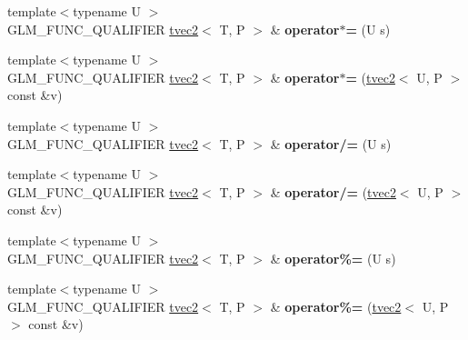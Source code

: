 \begin{DoxyCompactItemize}
\item 
\hypertarget{structglm_1_1detail_1_1tvec2_ae5c779a289045f3a99c6ee7efa608248}{{\footnotesize template$<$typename U $>$ }\\G\-L\-M\-\_\-\-F\-U\-N\-C\-\_\-\-Q\-U\-A\-L\-I\-F\-I\-E\-R \hyperlink{structglm_1_1detail_1_1tvec2}{tvec2}$<$ T, P $>$ \& {\bfseries operator$\ast$=} (U s)}\label{structglm_1_1detail_1_1tvec2_ae5c779a289045f3a99c6ee7efa608248}

\item 
\hypertarget{structglm_1_1detail_1_1tvec2_a74848e484fd662c04e7193575af09d97}{{\footnotesize template$<$typename U $>$ }\\G\-L\-M\-\_\-\-F\-U\-N\-C\-\_\-\-Q\-U\-A\-L\-I\-F\-I\-E\-R \hyperlink{structglm_1_1detail_1_1tvec2}{tvec2}$<$ T, P $>$ \& {\bfseries operator$\ast$=} (\hyperlink{structglm_1_1detail_1_1tvec2}{tvec2}$<$ U, P $>$ const \&v)}\label{structglm_1_1detail_1_1tvec2_a74848e484fd662c04e7193575af09d97}

\item 
\hypertarget{structglm_1_1detail_1_1tvec2_ab7aa78f8b11b296c3f69bd97ea1cf210}{{\footnotesize template$<$typename U $>$ }\\G\-L\-M\-\_\-\-F\-U\-N\-C\-\_\-\-Q\-U\-A\-L\-I\-F\-I\-E\-R \hyperlink{structglm_1_1detail_1_1tvec2}{tvec2}$<$ T, P $>$ \& {\bfseries operator/=} (U s)}\label{structglm_1_1detail_1_1tvec2_ab7aa78f8b11b296c3f69bd97ea1cf210}

\item 
\hypertarget{structglm_1_1detail_1_1tvec2_a1825aedcd2a9a93e31e15f24fe690dbd}{{\footnotesize template$<$typename U $>$ }\\G\-L\-M\-\_\-\-F\-U\-N\-C\-\_\-\-Q\-U\-A\-L\-I\-F\-I\-E\-R \hyperlink{structglm_1_1detail_1_1tvec2}{tvec2}$<$ T, P $>$ \& {\bfseries operator/=} (\hyperlink{structglm_1_1detail_1_1tvec2}{tvec2}$<$ U, P $>$ const \&v)}\label{structglm_1_1detail_1_1tvec2_a1825aedcd2a9a93e31e15f24fe690dbd}

\item 
\hypertarget{structglm_1_1detail_1_1tvec2_a71fc811c1ce1628d6bfec02d4603d890}{{\footnotesize template$<$typename U $>$ }\\G\-L\-M\-\_\-\-F\-U\-N\-C\-\_\-\-Q\-U\-A\-L\-I\-F\-I\-E\-R \hyperlink{structglm_1_1detail_1_1tvec2}{tvec2}$<$ T, P $>$ \& {\bfseries operator\%=} (U s)}\label{structglm_1_1detail_1_1tvec2_a71fc811c1ce1628d6bfec02d4603d890}

\item 
\hypertarget{structglm_1_1detail_1_1tvec2_a80bb57e041c1b98953c54d896dae08dc}{{\footnotesize template$<$typename U $>$ }\\G\-L\-M\-\_\-\-F\-U\-N\-C\-\_\-\-Q\-U\-A\-L\-I\-F\-I\-E\-R \hyperlink{structglm_1_1detail_1_1tvec2}{tvec2}$<$ T, P $>$ \& {\bfseries operator\%=} (\hyperlink{structglm_1_1detail_1_1tvec2}{tvec2}$<$ U, P $>$ const \&v)}\label{structglm_1_1detail_1_1tvec2_a80bb57e041c1b98953c54d896dae08dc}


\end{DoxyCompactItemize}

